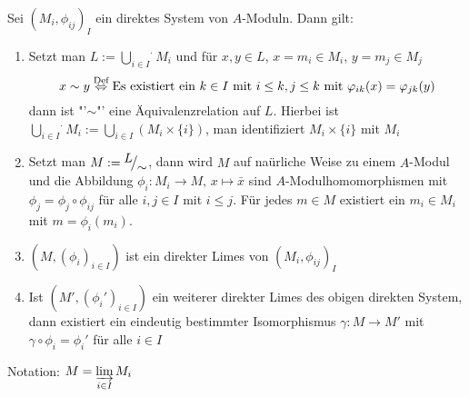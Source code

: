 \begin{sa}\label{16.6}
	Sei $(M_i, \phi_{ij})_I$ ein direktes System von $A$-Moduln. Dann gilt:
	\begin{enumerate}[label= \alph*)]
		\item Setzt man $L:= \overset{.}{\bigcup\limits_{i\in I}} M_i$ und für $x,y\in L$, $x= m_i \in M_i$, $y= m_j \in M_j$ 
		$$x\sim y \overset{\text{Def}}{\Leftrightarrow} \text{Es existiert ein }k\in I \text{ mit } i\leq k, j \leq k \text{ mit } \varphi_{ik}(x) = \varphi_{jk}(y)$$
		dann ist "'$\sim$"' eine Äquivalenzrelation auf $L$. Hierbei ist $\overset{.}{\bigcup\limits_{i\in I}} M_i:= \bigcup_{i\in I}(M_i \times \{i\})$, man identifiziert $M_i\times \{i\}$ mit $M_i$
		\item Setzt man $M:= \QR{L}{\sim}$, dann wird $M$ auf naürliche Weise zu einem $A$-Modul und die Abbildung $\phi_i : M_i \to M, \, x \mapsto \bar x$ sind $A$-Modulhomomorphismen mit $\phi_j = \phi_j \circ \phi_{ij}$ für alle $i,j\in I $ mit $i\leq j$. Für jedes $m\in M$ existiert ein $m_i \in M_i$ mit $m= \phi_i(m_i)$.
		\item $(M,(\phi_i)_{i\in I})$ ist ein direkter Limes von $(M_i, \phi_{ij})_I$
		\item Ist $(M', (\phi_i')_{i\in I})$ ein weiterer direkter Limes des obigen direkten System, dann existiert ein eindeutig bestimmter Isomorphismus $\gamma:M \to M'$ mit $\gamma \circ \phi_i = \phi_i'$ für alle $i\in I$
	\end{enumerate}
Notation: $M = \varinjlim\limits_{i\in I} M_i$
\end{sa}
